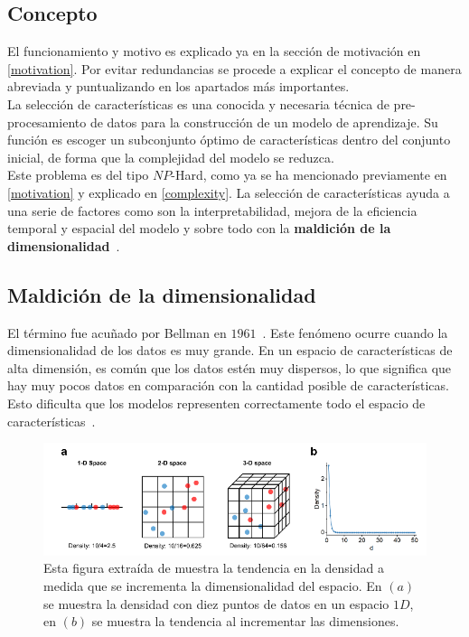\subsection{Concepto}
El funcionamiento y motivo es explicado ya en la sección de motivación en \ref{motivation}. Por evitar redundancias se procede a explicar el concepto de manera abreviada y puntualizando en los apartados más importantes.\\[6pt]
La selección de características es una conocida y necesaria técnica de pre-procesamiento de datos para la construcción de un modelo de aprendizaje. Su función es escoger un subconjunto óptimo de características dentro del conjunto inicial, de forma que la complejidad del modelo se reduzca.\\[6pt]
Este problema es del tipo $NP$-Hard, como ya se ha mencionado previamente en \ref{motivation} y explicado en \ref{complexity}.
La selección de características ayuda a una serie de factores como son la interpretabilidad, mejora de la eficiencia temporal y espacial del modelo y sobre todo con la \textbf{maldición de la dimensionalidad}~\cite{venkat2018curse, bellman1957dynamic}.

\subsection{Maldición de la dimensionalidad}
El término fue acuñado por Bellman en $1961$~\cite{bellman1961adaptive}. Este fenómeno ocurre cuando la dimensionalidad de los datos es muy grande. En un espacio de características de alta dimensión, es común que los datos estén muy dispersos, lo que significa que hay muy pocos datos en comparación con la cantidad posible de características. Esto dificulta que los modelos representen correctamente todo el espacio de características~\cite{peng_interpreting_2024}.

\begin{figure}[htp]
    \begin{center}
        \includegraphics[width=1\textwidth]{imagenes/curse-dimen-example.png}
    \end{center}
    \caption[Tendencia de incremento de dimensionalidad en varios espacios de características]{Esta figura extraída de \cite{peng_interpreting_2024} muestra la tendencia en la densidad a medida que se incrementa la dimensionalidad del espacio. En $(a)$ se muestra la densidad con diez puntos de datos en un espacio $1D$, en $(b)$ se muestra la tendencia al incrementar las dimensiones.}
\end{figure}

